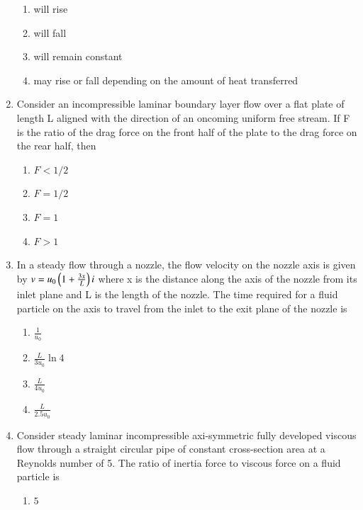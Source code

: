 \documentclass[journal]{IEEEtran}
\begin{document}
\begin{enumerate}
    \begin{enumerate}
        \item will rise 
        \item will fall
        \item will remain constant
        \item may rise or fall depending on the amount of heat transferred 
    \end{enumerate}
\bigskip
\item Consider an incompressible laminar boundary layer flow over a flat plate of length L aligned with the direction of an oncoming uniform free stream. If F is the ratio of the drag force on the front half of the plate to the drag force on the rear half, then
\begin{multicols}{4}
    \begin{enumerate}
        \item $F<1/2$
        \item $F=1/2$
        \item $F=1$
        \item $F>1$
    \end{enumerate}
\end{multicols}
\bigskip
\item In a steady flow through a nozzle, the flow velocity on the nozzle axis is given by $v = u_{0}\left(1 + \frac{3x}{L}\right) i$ where x is the distance along the axis of the nozzle from its inlet plane and L is the length of the nozzle. The time required for a fluid particle on the axis to travel from the inlet to the exit plane of the nozzle is
\begin{multicols}{4}
    \begin{enumerate}
        \item $\frac{1}{u_{0}}$
        \item $\frac{L}{3u_{0}}\ln{4}$
        \item $\frac{L}{4u_{0}}$
        \item $\frac{L}{2.5u_{0}}$
    \end{enumerate}
\end{multicols}
\bigskip
\item Consider steady laminar  incompressible axi-symmetric fully developed viscous flow through a straight circular pipe of constant cross-section area at a Reynolds number of 5. The ratio of inertia force to viscous force on a fluid particle is 
\begin{multicols}{4}
    \begin{enumerate}
        \item $5$

\end{enumerate}
\end{multicols}
\end{enumerate}
\end{document}
